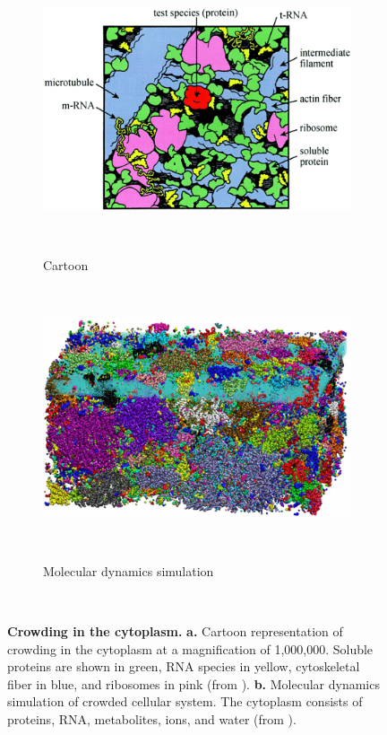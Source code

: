 ~\begin{figure}[h!]
  \centering
  ~\begin{subfigure}[b]{0.45\linewidth}
    \includegraphics[width=\linewidth]
{./literature_review/subcellular_location/proteome_distribution/img/crowding_cartoon.png}
  \caption{Cartoon}
  ~\end{subfigure}
\hfill
  ~\begin{subfigure}[b]{0.48\linewidth}
    \includegraphics[width=\linewidth]
{./literature_review/subcellular_location/proteome_distribution/img/crowding_MD.png}
  \caption{Molecular dynamics simulation}
  ~\end{subfigure}
  \caption{
\textbf{Crowding in the cytoplasm.} 
\textbf{a.}
Cartoon representation of crowding in the cytoplasm at a magnification of 1,000,000.
Soluble proteins are shown in green,
RNA species in yellow,
cytoskeletal fiber in blue,
and ribosomes in pink
(from \cite{minton2001}).
\textbf{b.}
Molecular dynamics simulation of crowded cellular system.
The cytoplasm consists of proteins, RNA, metabolites, ions, and water
(from \cite{feig2017}).
}
  \label{fig:crowding}
~\end{figure}




